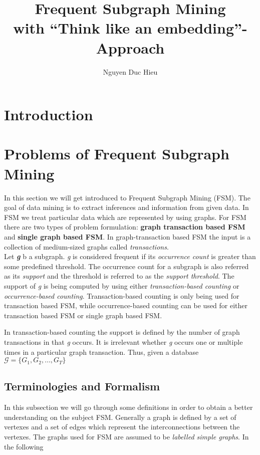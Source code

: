 \documentclass[12pt,a4paper]{article}
\author{Nguyen Duc Hieu}
\title{\textbf{Frequent Subgraph Mining \\with ``Think like an embedding''-Approach}}
\begin{document}
\maketitle
\newpage

\tableofcontents
\newpage

\section{Introduction}

\section{Problems of Frequent Subgraph Mining}
In this section we will get introduced to Frequent Subgraph Mining (FSM).
The goal of data mining is to extract inferences and information from given data.
In FSM we treat particular data which are represented by using graphs.
For FSM there are two types of problem formulation: \textbf{graph transaction based FSM} and \textbf{single graph based FSM}.
In graph-transaction based FSM the input is a collection of medium-sized graphs called \textit{transactions}.
\\

Let \textbf{\textit{g}} b a subgraph. \textit{g} is considered frequent if its \textit{occurrence count} is greater than some predefined threshold.
The occurrence count for a subgraph is also referred as its \textit{support} and the threshold is referred to as the \textit{support threshold}.
The support of \textit{g} is being computed by using either \textit{transaction-based counting} or \textit{occurrence-based counting}.
Transaction-based counting is only being used for transaction based FSM,
while occurrence-based counting can be used for either transaction based FSM or single graph based FSM.

In transaction-based counting the support is defined by the number of graph transactions in that \textit{g} occurs.
It is irrelevant whether \textit{g} occurs one or multiple times in a particular graph transaction.
Thus, given a database $\mathcal{G} = \{ G_{1},G_{2},\dots,G_{T} \}$





\subsection{Terminologies and Formalism}
In this subsection we will go through some definitions in order to obtain a better understanding on the subject FSM.
Generally a graph is defined by a set of vertexes and a set of edges which represent the interconnections between the vertexes.
The graphs used for FSM are assumed to be \textit{labelled simple graphs}.
In the following 
\\
\end{document}

